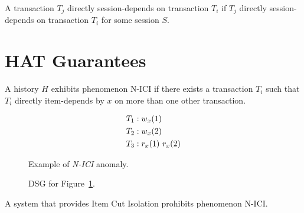 \begin{definition}
A transaction $T_j$ directly session-depends on transaction $T_i$ if
$T_j$ directly session-depends on transaction $T_i$ for some session
$S$.
\end{definition}

\section{HAT Guarantees}

\begin{definition}
\end{definition}

\begin{definition}
\end{definition}

\begin{definition}
A history $H$ exhibits phenomenon N-ICI if there exists a transaction
$T_i$ such that $T_i$ directly item-depends by $x$ on more than one
other transaction.
\end{definition}

\begin{figure}[H]
\begin{align*}
\small
T_1 &: w_x(1)\\
T_2 &: w_x(2)\\
T_3 &: r_x(1)~r_x(2)
\end{align*}
\caption{Example of \textit{N-ICI} anomaly.}
\label{fig:nici-history}
\end{figure}

\begin{figure}[H]
\centering
{}
\caption{DSG for Figure~\ref{fig:nici-history}.}
\label{fig:nici-dsg}
\end{figure}

\begin{definition}
A system that provides Item Cut Isolation prohibits phenomenon N-ICI.
\end{definition}

